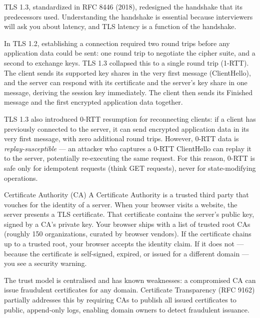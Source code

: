\documentclass[11pt,a4paper]{article}
\begin{document}
TLS 1.3, standardized in RFC 8446 (2018), redesigned the handshake that its predecessors used. Understanding the handshake is essential because interviewers will ask you about latency, and TLS latency is a function of the handshake.

In TLS 1.2, establishing a connection required two round trips before any application data could be sent: one round trip to negotiate the cipher suite, and a second to exchange keys. TLS 1.3 collapsed this to a single round trip (1-RTT). The client sends its supported key shares in the very first message (ClientHello), and the server can respond with its certificate and the server's key share in one message, deriving the session key immediately. The client then sends its Finished message and the first encrypted application data together.

TLS 1.3 also introduced 0-RTT resumption for reconnecting clients: if a client has previously connected to the server, it can send encrypted application data in its very first message, with zero additional round trips. However, 0-RTT data is \textit{replay-susceptible} --- an attacker who captures a 0-RTT ClientHello can replay it to the server, potentially re-executing the same request. For this reason, 0-RTT is safe only for idempotent requests (think GET requests), never for state-modifying operations.

\begin{termbox}{Certificate Authority (CA)}
A Certificate Authority is a trusted third party that vouches for the identity of a server. When your browser visits a website, the server presents a TLS certificate. That certificate contains the server's public key, signed by a CA's private key. Your browser ships with a list of trusted root CAs (roughly 150 organizations, curated by browser vendors). If the certificate chains up to a trusted root, your browser accepts the identity claim. If it does not --- because the certificate is self-signed, expired, or issued for a different domain --- you see a security warning.

The trust model is centralised and has known weaknesses: a compromised CA can issue fraudulent certificates for any domain. Certificate Transparency (RFC 9162) partially addresses this by requiring CAs to publish all issued certificates to public, append-only logs, enabling domain owners to detect fraudulent issuance.
\end{termbox}
\end{document}
